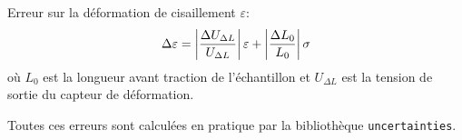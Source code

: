 Erreur sur la déformation de cisaillement \(\varepsilon\):
\begin{equation}
    \Delta \varepsilon = \left|\frac{\Delta U_{\Delta L}}{U_{\Delta L}}\right| \varepsilon + \left|\frac{\Delta L_0}{L_0}\right| \sigma
\end{equation}
où \(L_0\) est la longueur avant traction de l'échantillon et \(U_{\Delta L}\) est la tension de sortie du capteur de déformation.

Toutes ces erreurs sont calculées en pratique par la bibliothèque \texttt{uncertainties}.



